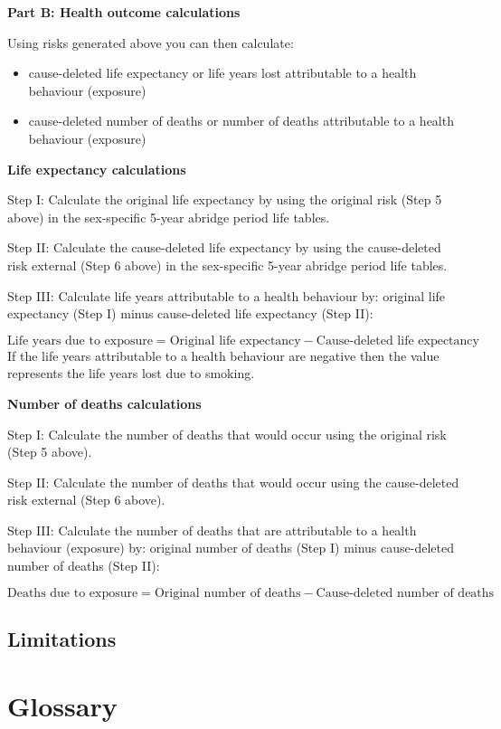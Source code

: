 \documentclass[]{book}
\providecommand{\tightlist}{%
  \setlength{\itemsep}{0pt}\setlength{\parskip}{0pt}}
\begin{document}
\textbf{Part B: Health outcome calculations}

Using risks generated above you can then calculate:

\begin{itemize}
\tightlist
\item
  cause-deleted life expectancy or life years lost attributable to a
  health behaviour (exposure)
\item
  cause-deleted number of deaths or number of deaths attributable to a
  health behaviour (exposure)
\end{itemize}

\textbf{Life expectancy calculations}

Step I: Calculate the original life expectancy by using the original
risk (Step 5 above) in the sex-specific 5-year abridge period life
tables.

Step II: Calculate the cause-deleted life expectancy by using the
cause-deleted risk external (Step 6 above) in the sex-specific 5-year
abridge period life tables.

Step III: Calculate life years attributable to a health behaviour by:
original life expectancy (Step I) minus cause-deleted life expectancy
(Step II):

\[ \text{Life years due to exposure} = \text{Original life expectancy} - \text{Cause-deleted life expectancy}\]
If the life years attributable to a health behaviour are negative then
the value represents the life years lost due to smoking.

\textbf{Number of deaths calculations}

Step I: Calculate the number of deaths that would occur using the
original risk (Step 5 above).

Step II: Calculate the number of deaths that would occur using the
cause-deleted risk external (Step 6 above).

Step III: Calculate the number of deaths that are attributable to a
health behaviour (exposure) by: original number of deaths (Step I) minus
cause-deleted number of deaths (Step II):

\[\text{Deaths due to exposure} = \text{Original number of deaths} - \text{Cause-deleted number of deaths}\]

\section{Limitations}\label{limitations}

\chapter{Glossary}\label{glossary}
\end{document}
